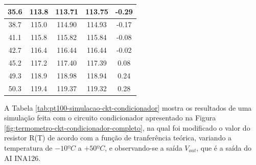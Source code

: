 \documentclass[a4paper]{instrumentacao}
\begin{document}
\begin{table}[H]
\begin{tabular}{|c|c|c|c|c|}
35.6           & 113.8                 & 113.71                     & 113.75                & -0.29                        \\ \hline
38.7           & 115.0                 & 114.90                     & 114.93                & -0.17                        \\ \hline
41.1           & 115.8                 & 115.82                     & 115.84                & -0.08                        \\ \hline
42.7           & 116.4                 & 116.44                     & 116.44                & -0.02                        \\ \hline
45.2           & 117.2                 & 117.40                     & 117.39                & 0.08                         \\ \hline
49.3           & 118.9                 & 118.98                     & 118.94                & 0.24                         \\ \hline
50.3           & 119.4                 & 119.37                     & 119.32                & 0.28                         \\ \hline
\end{tabular}
\end{table}

A Tabela \ref{tab:pt100-simulacao-ckt-condicionador} mostra os resultados de uma simulação feita com o circuito condicionador apresentado na Figura \ref{fig:termometro-ckt-condicionador-completo}, na qual foi modificado o valor do resistor R(T) de acordo com a função de tranferência teórica, variando a temperatura de $-10ºC$ a $+50ºC$, e observando-se a saída $V_{out}$, que é a saída do AI INA126.
\end{document}
